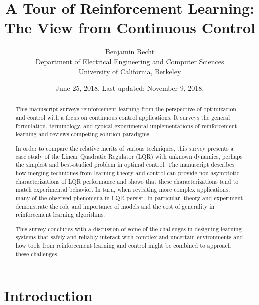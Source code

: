 \documentclass[11pt]{article}
\numberwithin{equation}{section}
\begin{document}
\title{A Tour of Reinforcement Learning:\\The View from Continuous Control}

\author{Benjamin Recht\\ 
Department of Electrical Engineering and Computer Sciences\\
University of California, Berkeley
}

\date{June 25, 2018. Last updated: November 9, 2018.}

\maketitle

\vspace{-0.25in}

\begin{abstract}

This manuscript surveys reinforcement learning from the perspective of optimization and control with a focus on continuous control applications. It surveys the general formulation, terminology, and typical experimental implementations of reinforcement learning and reviews competing solution paradigms.

In order to compare the relative merits of various techniques, this survey presents a case study of the Linear Quadratic Regulator (LQR) with unknown dynamics, perhaps the simplest and best-studied problem in optimal control. The manuscript describes how merging techniques from learning theory and control can provide non-asymptotic characterizations of LQR performance and shows that these characterizations tend to match experimental behavior. In turn, when revisiting more complex applications, many of the observed phenomena in LQR persist. In particular, theory and experiment demonstrate the role and importance of models and the cost of generality in reinforcement learning algorithms.

This survey concludes with a discussion of some of the challenges in designing learning systems that safely and reliably interact with complex and uncertain environments and how tools from reinforcement learning and control might be combined to approach these challenges.

\end{abstract}

\section{Introduction}
\end{document}
